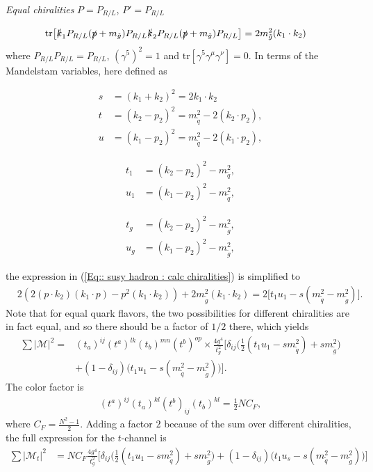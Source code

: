 \documentclass[twoside,english]{uiofysmaster}
\begin{document}
\begin{center}
\textit{Equal chiralities} $P=P_{R/L}$, $P'=P_{R/L}$
\end{center}
\begin{align*}
\text{tr} \big[ 
\slashed{k}_1 P_{R/L} (\slashed{p} + m_{\tilde{g}}) P_{R/L} \slashed{k}_2 P_{R/L} (\slashed{p} + m_{\tilde{g}}) P_{R/L} \big]&= 2  m_{\tilde{g}}^2 (k_1 \cdot k_2)
\end{align*}
where $P_{R/L}P_{R/L} = P_{R/L}$, $(\gamma^5)^2 = 1$ and $\text{tr}[\gamma^5 \gamma^{\mu} \gamma^{\nu}]=0$. In terms of the Mandelstam variables, here defined as
\begin{multicols}{3}

\begin{align*}
s &= (k_1 + k_2)^2 = 2 k_1 \cdot k_2\\
t &= (k_2-p_2)^2 = m_{\tilde{q}}^2 - 2 (k_2 \cdot p_2),\\
u &= (k_1 - p_2)^2 = m_{\tilde{q}}^2 - 2 (k_1 \cdot p_2),
\end{align*}

\begin{align*}
t_1 &= (k_2-p_2)^2 - m_{\tilde{q}}^2,\\
u_1 &= (k_1-p_2)^2 - m_{\tilde{q}}^2,
\end{align*}

\begin{align*}
t_g &= (k_2-p_2)^2 - m_{\tilde{g}}^2,\\
u_g &= (k_1-p_2)^2 - m_{\tilde{g}}^2,
\end{align*}

\end{multicols}
the expression in (\ref{Eq:: susy hadron : calc chiralities}) is simplified to
\begin{align*}
&2(2 (p \cdot k_2) (k_1 \cdot p) - p^2 (k_1 \cdot k_2) ) + 2m_{\tilde{g}}^2 (k_1 \cdot k_2) =  2 \big[t_1u_1 -s(m_{\tilde{q}}^2 - m_{\tilde{g}}^2) \big].
\end{align*}
Note that for equal quark flavors, the two possibilities for different chiralities are in fact equal, and so there should be a factor of $1/2$ there, which yields 
\begin{align*}
\sum |\mathcal{M}|^2 =&   (t_a)^{ij} (t^a)^{lk} (t_b)^{mn} (t^b)^{op}  \times\frac{4 g^4}{t_g^2} \Big[\delta_{ij} \big(\frac{1}{2}(t_1u_1 -sm_{\tilde{q}}^2)+  sm_{\tilde{g}}^2 \big)\\& + (1-\delta_{ij})\big(t_1u_1 -s(m_{\tilde{q}}^2- m_{\tilde{g}}^2) \big)\Big].
\end{align*}
The color factor is
\begin{align*}
(t^a)^{ij}(t_a)^{kl}(t^b)_{ij}(t_b)^{kl} = \frac{1}{2}NC_F,
\end{align*}
where $C_F = \frac{N^2 -1}{2}$. Adding a factor $2$ because of the sum over different chiralities, the full expression for the $t$-channel is
\begin{align*}
\sum |\mathcal{M}_t|^2 &= NC_F \frac{4g^4}{t_g^2} \Big[ \delta_{ij} \big(\frac{1}{2}(t_1u_1-sm_{\tilde{q}}^2) + sm_{\tilde{g}}^2 \big) + (1-\delta_{ij}) \big(t_1u_s - s(m_{\tilde{q}}^2 - m_{\tilde{g}}^2) \big)\Big]
\end{align*}
\end{document}
